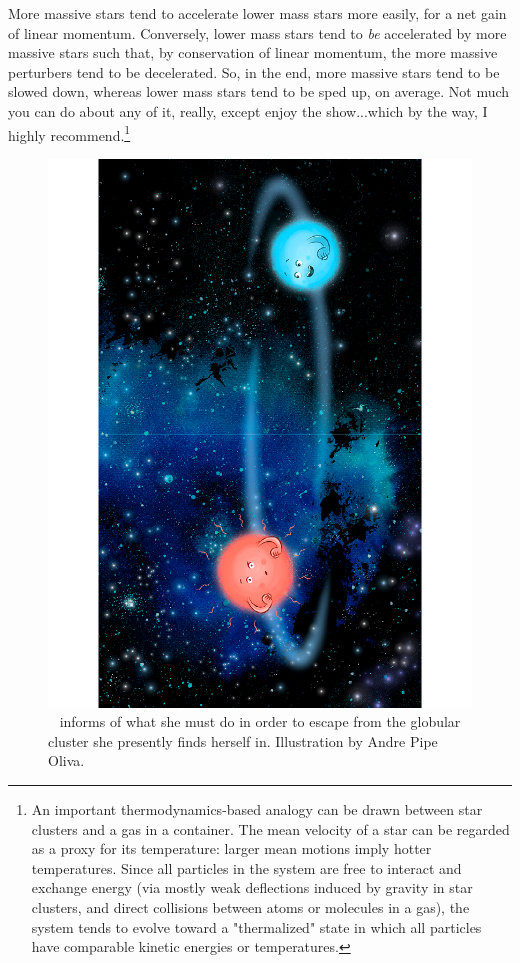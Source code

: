 \documentclass[main.tex]{subfiles}
\begin{document}
\par \Enrico More massive stars tend to accelerate lower mass stars more easily, for a net gain of linear momentum.  Conversely, lower mass stars tend to \textit{be} accelerated by more massive stars such that, by conservation of linear momentum, the more massive perturbers tend to be decelerated. So, in the end, more massive stars tend to be slowed down, whereas lower mass stars tend to be sped up, on average.  Not much you can do about any of it, really, except enjoy the show...which by the way, I highly recommend.\footnote{An important thermodynamics-based analogy can be drawn between star clusters and a gas in a container.  The mean velocity of a star can be regarded as a proxy for its temperature:  larger mean motions imply hotter temperatures.  Since all particles in the system are free to interact and exchange energy (via mostly weak deflections induced by gravity in star clusters, and direct collisions between atoms or molecules in a gas), the system tends to evolve toward a "thermalized" state in which all particles have comparable kinetic energies or temperatures.}

\begin{figure}
\includegraphics[width=\columnwidth,angle=270,origin=c]{ch3_3.pdf}
\caption{\rmenrico~ informs \rmsterope of what she must do in order to escape from the globular cluster she presently finds herself in.  Illustration by Andre Pipe Oliva.
\label{fig:fig1}}
\end{figure}
\end{document}
